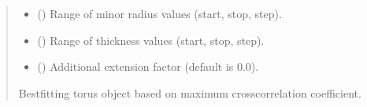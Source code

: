 \documentclass[letterpaper,10pt,english]{sphinxmanual}
\begin{document}
\begin{fulllineitems}
\begin{fulllineitems}
\begin{quote}
\begin{description}
\begin{itemize}
\item {} 
\sphinxAtStartPar
{} (\sphinxstyleliteralemphasis{\sphinxupquote{, }}) \textendash{} Range of minor radius values (start, stop, step).

\item {} 
\sphinxAtStartPar
{} (\sphinxstyleliteralemphasis{\sphinxupquote{, }}) \textendash{} Range of thickness values (start, stop, step).

\item {} 
\sphinxAtStartPar
{} (\sphinxstyleliteralemphasis{\sphinxupquote{, }}) \textendash{} Additional extension factor (default is 0.0).

\end{itemize}

\sphinxAtStartPar
Best\sphinxhyphen{}fitting torus object based on maximum cross\sphinxhyphen{}correlation coefficient.

\sphinxAtStartPar
{\hyperref[\detokenize{src:src.Torus.Torus}]{}}

\end{description}\end{quote}

\end{fulllineitems}



\end{fulllineitems}
\end{document}
